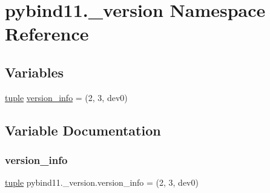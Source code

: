 \hypertarget{namespacepybind11_1_1__version}{}\section{pybind11.\+\_\+version Namespace Reference}
\label{namespacepybind11_1_1__version}
\subsection*{Variables}
\begin{DoxyCompactItemize}
\item 
\mbox{\hyperlink{classtuple}{tuple}} \mbox{\hyperlink{namespacepybind11_1_1__version_ac5010c756a2efbb026f14bf9fe97fb07}{version\+\_\+info}} = (2, 3, \textquotesingle{}dev0\textquotesingle{})
\end{DoxyCompactItemize}


\subsection{Variable Documentation}
\mbox{\label{namespacepybind11_1_1__version_ac5010c756a2efbb026f14bf9fe97fb07}} 
\subsubsection{\texorpdfstring{version\_info}{version\_info}}
{\footnotesize\ttfamily \mbox{\hyperlink{classtuple}{tuple}} pybind11.\+\_\+version.\+version\+\_\+info = (2, 3, \textquotesingle{}dev0\textquotesingle{})}

